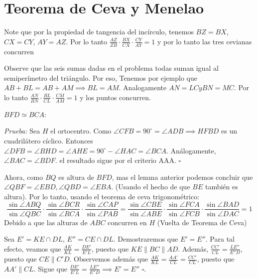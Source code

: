 \section{Teorema de Ceva y Menelao}

\begin{sol}
	Note que por la propiedad de tangencia del inc\'irculo, tenemos $BZ =BX$, $CX = CY$, $AY = AZ$. Por lo tanto $\frac{AZ}{ZB}\cdot \frac{BX}{CX} \cdot \frac{CY}{AY} = 1$ y por lo tanto las tres cevianas concurren
\end{sol}

\begin{sol}
	Observe que las seis sumas dadas en el problema todas suman igual al semiper\'imetro del tri\'angulo. Por eso, Tenemos por ejemplo que $AB+BL = AB + AM \implies BL = AM$. Analogamente $AN = LC y BN = MC$. Por lo tanto $\frac{AN}{BN}\cdot \frac{BL}{CL} \cdot \frac{CM}{AM} = 1$ y los puntos concurren.
\end{sol}

\begin{sol}
	\begin{lem}
		$BFD \simeq BCA$:
	\end{lem}
	\textit{Prueba:} Sea $H$ el ortocentro. Como $\angle{CFB} = 90^{\circ} = \angle{ADB} \implies  HFBD $ es un cuadril\'atero c\'iclico. Entonces $\angle{DFB} =\angle{BHD} = \angle{AHE} = 90^{\circ} - \angle {HAC} = \angle{BCA}$. An\'alogamente, $\angle{BAC } = \angle{BDF}$. el resultado sigue por el criterio AAA. $\square$
	
	Ahora, como $BQ$ es altura de $BFD$, mas el lemma anterior podemos concluir que $\angle{QBF} = \angle{EBD}, \angle{QBD} = \angle{EBA}$. (Usando el hecho de que $BE$ tambi\'en es altura). Por lo tanto, usando el teorema de ceva trigonom\'etrico:
	\begin{equation}
	\frac{\sin{\angle{ABQ}}}{\sin{\angle{QBC}}} \cdot\frac{\sin{\angle{BCR}}}{\sin{\angle{RCA}}} \cdot\frac{\sin{\angle{CAP}}}{\sin{\angle{PAB}}} = \frac{\sin{\angle{CBE}}}{\sin{\angle{ABE}}} \cdot\frac{\sin{\angle{FCA}}}{\sin{\angle{FCB}}} \cdot\frac{\sin{\angle{BAD}}}{\sin{\angle{DAC}}} = 1
	\end{equation}
	Debido a que las alturas de $ABC$ concurren en $H$ (Vuelta de Teorema de Ceva)
\end{sol}

\begin{sol}
	Sea $E' = KE \cap DL$, $E'' = CE \cap DL$. Demostraremos que $E' = E''$. Para tal efecto, veamos que $\frac{AK}{KL} = \frac{DE'}{E'L}$, puesto que $KE \parallel BC \parallel AD$. Adem\'as, $\frac{CC'}{CL}= \frac{LE''}{E''D}$, puesto que $CE \parallel C'D$. Observemos adem\'as que $\frac{AK}{KL} = \frac{AA'}{CL} = \frac{CC'}{CL}$, puesto que $AA' \parallel CL$. Sigue que $\frac{DE'}{E'L} = \frac{LE''}{E''D} \implies E' = E''$ $\square$.
\end{sol}

